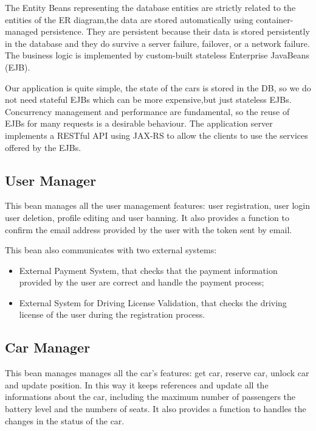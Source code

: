 The Entity Beans representing the database entities are strictly related to the entities of the ER diagram,the data  are stored automatically using container-managed persistence.
They are persistent because their data is stored persistently in the database and they do survive a server failure, failover, or a network failure.
The business logic is implemented by custom-built stateless Enterprise JavaBeans (EJB).

Our application is quite simple, the state of the cars is stored in the DB, so we do not need stateful EJBs which can be more expensive,but just stateless EJBs.
Concurrency management and performance are fundamental, so the reuse of EJBs for many requests is a desirable behaviour.
The application server implements a RESTful API using JAX-RS to allow the clients to use the services offered by the EJBs.



\subsection{User Manager}
This bean manages all the user management features: user registration, user login user deletion, profile editing and user banning.
It also provides a function to confirm the email address provided by the user with the token sent by email.

This bean also communicates with two external systems:
\begin{itemize}
\item External Payment System, that checks that the payment information provided by the user are correct and handle the payment process;
\item External System for Driving License Validation, that checks the driving license of the user during the registration process.
\end{itemize}

\subsection{Car Manager}
This bean manages manages all the car's features: get car, reserve car, unlock car and update position.
In this way it keeps references and update all the informations about the car, including the maximum number of passengers the battery level and the numbers of seats.
It also provides a function to handles the changes in the status of the car.

